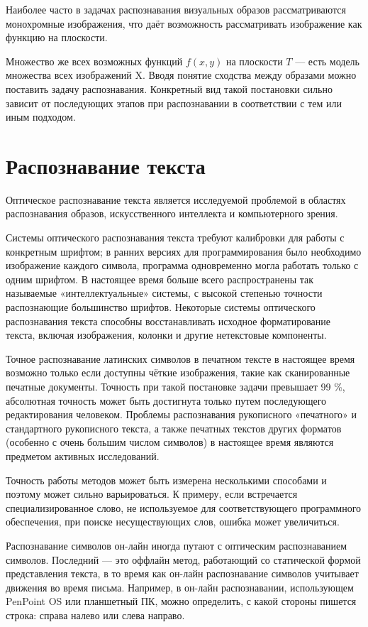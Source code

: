 Наиболее часто в задачах распознавания визуальных образов рассматриваются монохромные изображения, что даёт возможность рассматривать изображение как функцию на плоскости.

Множество же всех возможных функций $f(x, y)$ на плоскости $T$ --- есть модель множества всех изображений X. Вводя понятие сходства между образами можно поставить задачу распознавания. Конкретный вид такой постановки сильно зависит от последующих этапов при распознавании в соответствии с тем или иным подходом.

\section{Распознавание текста}
Оптическое распознавание текста является исследуемой проблемой в областях распознавания образов, искусственного интеллекта и компьютерного зрения.

Системы оптического распознавания текста требуют калибровки для работы с конкретным шрифтом; в ранних версиях для программирования было необходимо изображение каждого символа, программа одновременно могла работать только с одним шрифтом. В настоящее время больше всего распространены так называемые «интеллектуальные» системы, с высокой степенью точности распознающие большинство шрифтов. Некоторые системы оптического распознавания текста способны восстанавливать исходное форматирование текста, включая изображения, колонки и другие нетекстовые компоненты.

Точное распознавание латинских символов в печатном тексте в настоящее время возможно только если доступны чёткие изображения, такие как сканированные печатные документы. Точность при такой постановке задачи превышает 99 \%, абсолютная точность может быть достигнута только путем последующего редактирования человеком. Проблемы распознавания рукописного «печатного» и стандартного рукописного текста, а также печатных текстов других форматов (особенно с очень большим числом символов) в настоящее время являются предметом активных исследований.

Точность работы методов может быть измерена несколькими способами и поэтому может сильно варьироваться. К примеру, если встречается специализированное слово, не используемое для соответствующего программного обеспечения, при поиске несуществующих слов, ошибка может увеличиться.

Распознавание символов он-лайн иногда путают с оптическим распознаванием символов. Последний --- это оффлайн метод, работающий со статической формой представления текста, в то время как он-лайн распознавание символов учитывает движения во время письма. Например, в он-лайн распознавании, использующем PenPoint OS или планшетный ПК, можно определить, с какой стороны пишется строка: справа налево или слева направо.

